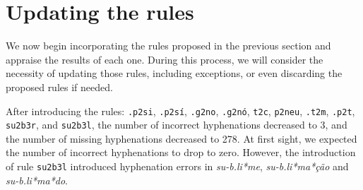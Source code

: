 \section{Updating the rules}
We now begin incorporating the rules proposed in the previous section and
appraise the results of each one. During this process, we will consider the
necessity of updating those rules, including exceptions, or even discarding the
proposed rules if needed.


%
% 
%


After introducing the rules: \texttt{.p2si}, \texttt{.p2sí}, \texttt{.g2no}, \texttt{.g2nó}, \texttt{t2c}, 
\texttt{p2neu}, \texttt{.t2m}, \texttt{.p2t}, \texttt{su2b3r}, and \texttt{su2b3l}, 
the number of incorrect hyphenations decreased to 3, and the number of missing hyphenations decreased to 278.
At first sight, we expected the number of incorrect hyphenations to drop to zero. However, 
the introduction of rule \texttt{su2b3l} introduced hyphenation errors in \emph{su-b.li*me}, \emph{su-b.li*ma*ção} and \emph{su-b.li*ma*do}.

